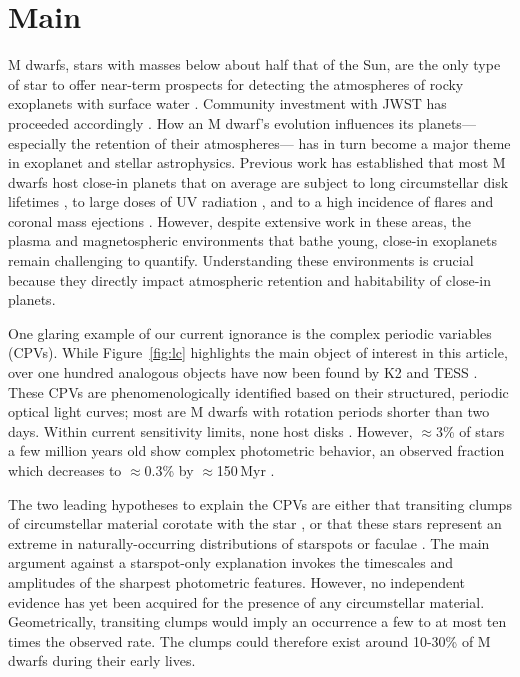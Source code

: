 \documentclass{nature3}
\begin{document}

\section{Main}
\label{sec:main}

M dwarfs, stars with masses below about half that of the Sun, are the
only type of star to offer near-term prospects for detecting the
atmospheres of rocky exoplanets with surface water \cite{NAP26141}.
Community investment with JWST has proceeded accordingly
\cite{Redfield2024,TRAPPIST1JWSTCommunityInitiative2024}.  How an M
dwarf's evolution influences its planets---especially the retention of
their atmospheres--- has in turn become a major theme in
exoplanet and stellar astrophysics.  Previous work has established
that most M dwarfs host close-in planets \cite{Dressing2015} that 
on average are subject to long circumstellar disk lifetimes
\cite{Ribas2015}, to large doses of UV radiation \cite{France2013},
and to a high incidence of flares and coronal mass ejections
\cite{Gunther2020}.  However, despite extensive work in these areas,
the plasma and magnetospheric environments that bathe young, close-in
exoplanets remain challenging to quantify.
Understanding these environments is crucial because they directly
impact atmospheric retention and habitability of close-in planets.

One glaring example of our current ignorance is the complex periodic
variables (CPVs).  While Figure~\ref{fig:lc} highlights the main
object of interest in this article, over one hundred analogous objects
have now been found by K2 and TESS
\cite{Rebull2016,Stauffer2017,Rebull2018,Zhan2019,Rebull2020,Bouma2024}.
These CPVs are phenomenologically identified based on their
structured, periodic optical light curves; most are M dwarfs with
rotation periods shorter than two days.  Within current sensitivity
limits, none host disks \cite{Stauffer2017,Bouma2024}.
However, $\approx$3\% of stars a few million years old show complex
photometric behavior, an observed fraction which decreases to $\approx$0.3\% by
$\approx$150\,Myr \cite{Rebull2020}.

The two leading hypotheses to explain the CPVs are either that
transiting clumps of circumstellar material corotate with the star
\cite{Stauffer2017,Gunther2022,Bouma2024}, or that these stars
represent an extreme in naturally-occurring distributions of starspots
or faculae \cite{Koen2021}.  The main argument against a starspot-only
explanation invokes the timescales and amplitudes of the sharpest
photometric features.  However, no independent evidence has yet been
acquired for the presence of any circumstellar material.
Geometrically, transiting clumps would imply an occurrence a few to at
most ten times the observed rate.  The clumps could therefore exist
around 10-30\% of M dwarfs during their early lives.
\end{document}
